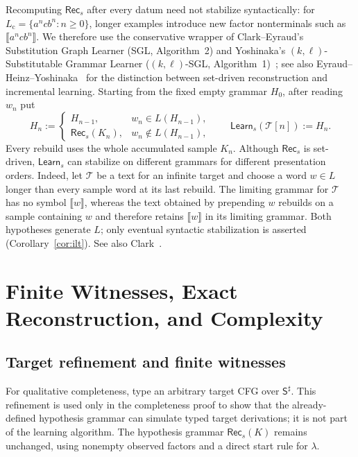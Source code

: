 \documentclass[11pt,a4paper]{article}
\newcommand{\NT}[1]{\llbracket #1\rrbracket}
\theoremstyle{remark}
\theoremstyle{plain}
\begin{document}
Recomputing $\mathsf{Rec}_s$ after every datum need not stabilize
syntactically: for $L_{\mathrm c}=\{a^ncb^n:n\ge0\}$, longer examples
introduce new factor nonterminals such as $\NT{a^ncb^n}$.
We therefore use the conservative wrapper of Clark--Eyraud's
Substitution Graph Learner (SGL, Algorithm~2) and Yoshinaka's
$(k,\ell)$-Substitutable Grammar Learner ($(k,\ell)$-SGL, Algorithm~1)~\cite{clark-eyraud2007,yoshinaka2008};
see also Eyraud--Heinz--Yoshinaka~\cite[Appendix]{eyraud-heinz-yoshinaka2016}
for the distinction between set-driven reconstruction and incremental learning.
Starting from the fixed empty grammar $H_0$, after reading $w_n$ put
\[
 H_n:=
 \begin{cases}
 H_{n-1},&w_n\in L(H_{n-1}),\\
 \mathsf{Rec}_s(K_n),&w_n\notin L(H_{n-1}),
 \end{cases}
 \qquad
 \mathsf{Learn}_s(\mathcal T[n]):=H_n.
\]
Every rebuild uses the whole accumulated sample $K_n$. Although
$\mathsf{Rec}_s$ is set-driven, $\mathsf{Learn}_s$ can stabilize on
different grammars for different presentation orders. Indeed, let
$\mathcal T$ be a text for an infinite target and choose a word
$w\in L$ longer than every sample word at its last rebuild.
The limiting grammar for $\mathcal T$ has no symbol $\NT{w}$,
whereas the text obtained by prepending $w$ rebuilds on a sample
containing $w$ and therefore retains $\NT{w}$ in its limiting
grammar. Both hypotheses generate $L$; only eventual syntactic
stabilization is asserted (Corollary~\ref{cor:ilt}).
See also Clark~\cite[Section~4, Example~1]{clark2013}.

\section{Finite Witnesses, Exact Reconstruction, and Complexity}
\label{sec:typing}


\subsection{Target refinement and finite witnesses}

For qualitative completeness, type an arbitrary target
CFG over $\mathsf S^\sharp$.  This refinement is used only in
the completeness proof to show that the already-defined hypothesis
grammar can simulate typed target derivations; it is not part of
the learning algorithm. The hypothesis grammar
$\mathsf{Rec}_s(K)$ remains unchanged, using nonempty observed
factors and a direct start rule for $\lambda$.
\end{document}
